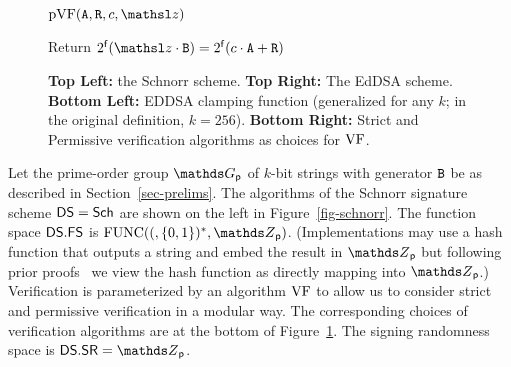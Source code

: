 \begin{figure}[t]
{		\begin{algorithm-initial}{$\pVF(\curvepoint{A}, \curvepoint{R}, c, \z)$}
			\item Return $2^\cofactor(\z \cdot  \generatorEDSA)= 2^\cofactor(c \cdot \curvepoint{A} + \curvepoint{R})$
		\end{algorithm-initial} 
	}

\vspace{-8pt}
\caption{\textbf{Top Left:} the Schnorr scheme. \textbf{Top Right:} The EdDSA scheme. \textbf{Bottom Left:} EDDSA clamping function (generalized for any $k$; in the original definition, $k=256$). \textbf{Bottom Right:} Strict and Permissive verification algorithms as choices for $\mathrm{VF}$.
}
\label{fig-eddsa}\label{fig-schnorr}\label{fig:VFs}
\hrulefill
\vspace{-10pt}
\end{figure}

 Let the prime-order group $\G_{\Prime}$ of $k$-bit strings with generator $\mathtt{B}$ be as described in Section~\ref{sec-prelims}. The algorithms of the  Schnorr signature scheme $\mathsf{DS}=\mathsf{Sch}$
are shown on the left in Figure~\ref{fig-schnorr}. 
The function space $\mathsf{DS}.\mathsf{FS}$ is $\AllFuncs(\bits^*,\Z_{\Prime})$. (Implementations may use a hash function that outputs a string and embed the result in $\Z_{\Prime}$ but following prior proofs~\cite{EC:AABN02} we view the hash function as directly mapping into $\Z_{\Prime}$.) Verification is parameterized by an algorithm $\mathrm{VF}$ to allow us to consider strict and permissive verification in a modular way. The corresponding choices of verification algorithms are at the bottom of Figure~\ref{fig:VFs}. The signing randomness space is $\DS.\SigCoins = \Z_{\Prime}$.


